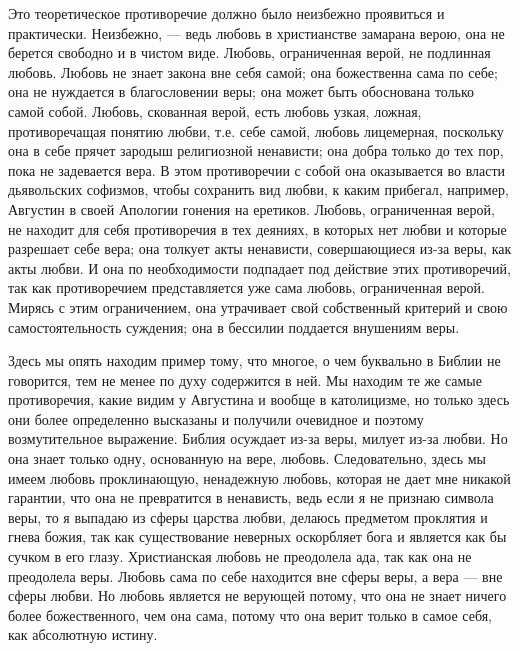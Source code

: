 \documentclass[12pt,oneside]{book}
\begin{document}
Это теоретическое противоречие должно было неизбежно проявиться и практически. Неизбежно, --- ведь любовь в христианстве замарана верою, она не берется свободно и в чистом виде. Любовь, ограниченная верой, не подлинная любовь\dag\let\svthefootnote\thefootnote\let\thefootnote\relax{}\let\thefootnote\svthefootnote. Любовь не знает закона вне себя самой; она божественна сама по себе; она не нуждается в благословении веры; она может быть обоснована только самой собой. Любовь, скованная верой, есть любовь узкая, ложная, противоречащая понятию любви, т.е. себе самой, любовь лицемерная, поскольку она в себе прячет зародыш религиозной ненависти; она добра только до тех пор, пока не задевается вера. В этом противоречии с собой она оказывается во власти дьявольских софизмов, чтобы сохранить вид любви, к каким прибегал, например, Августин в своей Апологии гонения на еретиков. Любовь, ограниченная верой, не находит для себя противоречия в тех деяниях, в которых нет любви и которые разрешает себе вера; она толкует акты ненависти, совершающиеся из-за веры, как акты любви. И она по необходимости подпадает под действие этих противоречий, так как противоречием представляется уже сама любовь, ограниченная верой. Мирясь с этим ограничением, она утрачивает свой собственный критерий и свою самостоятельность суждения; она в бессилии поддается внушениям веры.



Здесь мы опять находим пример тому, что многое, о чем буквально в Библии не говорится, тем не менее по духу содержится в ней. Мы находим те же самые противоречия, какие видим у Августина и вообще в католицизме, но только здесь они более определенно высказаны и получили очевидное и поэтому возмутительное выражение. Библия осуждает из-за веры, милует из-за любви. Но она знает только одну, основанную на вере, любовь. Следовательно, здесь мы имеем любовь проклинающую, ненадежную любовь, которая не дает мне никакой гарантии, что она не превратится в ненависть, ведь если я не признаю символа веры, то я выпадаю из сферы царства любви, делаюсь предметом проклятия и гнева божия, так как существование неверных оскорбляет бога и является как бы сучком в его глазу. Христианская любовь не преодолела ада, так как она не преодолела веры. Любовь сама по себе находится вне сферы веры, а вера --- вне сферы любви. Но любовь является не верующей потому, что она не знает ничего более божественного, чем она сама, потому что она верит только в самое себя, как абсолютную истину.
\end{document}
